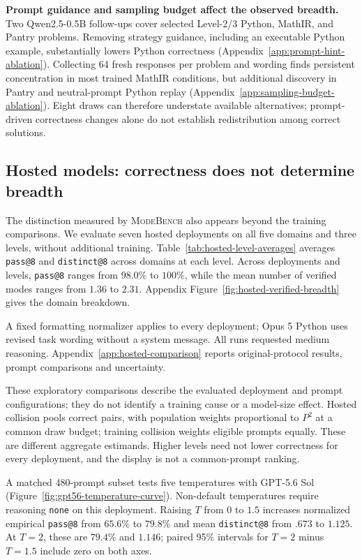 \documentclass{article}
\newcommand{\1}{\mathbf 1}
\newcommand{\mb}{\textsc{ModeBench}}
\theoremstyle{remark}
\theoremstyle{definition}
\theoremstyle{plain}
\begin{document}
\textbf{Prompt guidance and sampling budget affect the observed breadth.}
Two Qwen2.5-0.5B follow-ups cover selected Level-2/3 Python, MathIR, and
Pantry problems. Removing strategy guidance, including an executable Python
example, substantially lowers Python correctness
(Appendix~\ref{app:prompt-hint-ablation}). Collecting 64 fresh responses per
problem and wording finds persistent concentration in most trained MathIR
conditions, but additional discovery in Pantry and neutral-prompt Python
replay (Appendix~\ref{app:sampling-budget-ablation}). Eight draws can therefore
understate available alternatives; prompt-driven correctness changes alone
do not establish redistribution among correct solutions.

\subsection{Hosted models: correctness does not determine breadth}
\label{sec:hosted-concentration}

The distinction measured by \mb{} also appears beyond the training comparisons.
We evaluate seven hosted deployments on all five domains and three levels,
without additional training. Table~\ref{tab:hosted-level-averages} averages
\texttt{pass@8} and \texttt{distinct@8} across domains at each level.
Across deployments and levels, \texttt{pass@8} ranges from $98.0\%$ to
$100\%$, while the mean number of verified modes ranges from $1.36$ to
$2.31$. Appendix Figure~\ref{fig:hosted-verified-breadth} gives the domain breakdown.



A fixed formatting normalizer applies to every deployment; Opus 5 Python
uses revised task wording without a system message. All runs requested
medium reasoning. Appendix~\ref{app:hosted-comparison} reports
original-protocol results, prompt comparisons and uncertainty.

These exploratory comparisons describe the evaluated deployment and prompt
configurations; they do not identify a training cause or a model-size effect.
Hosted collision pools correct pairs, with population weights proportional
to $P^2$ at a common draw budget; training collision weights eligible prompts
equally. These are different aggregate estimands. Higher levels need not
lower correctness for every deployment, and the display is not a common-prompt ranking.

A matched 480-prompt subset tests five temperatures with GPT-5.6 Sol
(Figure~\ref{fig:gpt56-temperature-curve}). Non-default temperatures require
reasoning \texttt{none} on this deployment. Raising $T$ from $0$ to $1.5$
increases normalized empirical \texttt{pass@8} from $65.6\%$ to $79.8\%$
and mean \texttt{distinct@8} from $.673$ to $1.125$.
At $T=2$, these are $79.4\%$ and $1.146$; paired 95\% intervals for
$T=2$ minus $T=1.5$ include zero on both axes.
\end{document}
